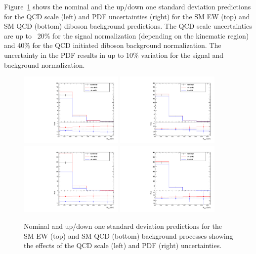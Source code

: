 Figure~\ref{fig:theory} shows the nominal and the up/down one standard deviation predictions for the QCD scale (left) and PDF uncertainties (right) for the SM EW (top) and SM QCD (bottom) diboson background predictions. The QCD scale uncertainties are  up to ~20\% for the signal normalization (depending on the kinematic region) and 40\% for the QCD initiated diboson background normalization. The uncertainty in the PDF results in up to 10\% variation for the signal and background normalization.
\begin{figure}[!htbp]
  \begin{center}
    \includegraphics[width=0.45\textwidth]{Plots/systematic/diboson_QCDScale.pdf}
    \includegraphics[width=0.45\textwidth]{Plots/systematic/diboson_PDFScale.pdf}
    \includegraphics[width=0.45\textwidth]{Plots/systematic/VVjjQCD_QCDScale.pdf}
    \includegraphics[width=0.45\textwidth]{Plots/systematic/VVjjQCD_PDFScale.pdf}
    \caption{Nominal and up/down one standard deviation predictions for the SM EW (top) and SM QCD (bottom) background processes showing the effects of the QCD scale (left) and PDF (right) uncertainties.}
    \label{fig:theory}
  \end{center}
\end{figure}

